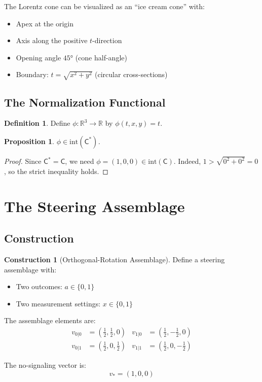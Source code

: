 \documentclass[11pt,a4paper]{article}
\newtheorem{proposition}[theorem]{Proposition}
\theoremstyle{definition}
\newtheorem{definition}[theorem]{Definition}
\newtheorem{construction}[theorem]{Construction}
\newcommand{\C}{\mathsf{C}}
\newcommand{\Cstar}{\mathsf{C}^*}
\newcommand{\R}{\mathbb{R}}
\newcommand{\interior}{\mathrm{int}}
\begin{document}
The Lorentz cone can be visualized as an ``ice cream cone'' with:
\begin{itemize}
    \item Apex at the origin
    \item Axis along the positive $t$-direction
    \item Opening angle $45°$ (cone half-angle)
    \item Boundary: $t = \sqrt{x^2 + y^2}$ (circular cross-sections)
\end{itemize}

\subsection{The Normalization Functional}

\begin{definition}
Define $\phi : \R^3 \to \R$ by $\phi(t, x, y) = t$.
\end{definition}

\begin{proposition}
$\phi \in \interior(\Cstar)$.
\end{proposition}

\begin{proof}
Since $\Cstar = \C$, we need $\phi = (1, 0, 0) \in \interior(\C)$. Indeed, $1 > \sqrt{0^2 + 0^2} = 0$, so the strict inequality holds.
\end{proof}

\section{The Steering Assemblage}

\subsection{Construction}

\begin{construction}[Orthogonal-Rotation Assemblage]\label{const:assemblage}
Define a steering assemblage with:
\begin{itemize}
    \item Two outcomes: $a \in \{0, 1\}$
    \item Two measurement settings: $x \in \{0, 1\}$
\end{itemize}

The assemblage elements are:
\begin{align}
v_{0|0} &= \left(\frac{1}{2}, \frac{1}{2}, 0\right) & v_{1|0} &= \left(\frac{1}{2}, -\frac{1}{2}, 0\right) \\[0.5em]
v_{0|1} &= \left(\frac{1}{2}, 0, \frac{1}{2}\right) & v_{1|1} &= \left(\frac{1}{2}, 0, -\frac{1}{2}\right)
\end{align}

The no-signaling vector is:
\[
v_* = (1, 0, 0)
\]
\end{construction}
\end{document}
